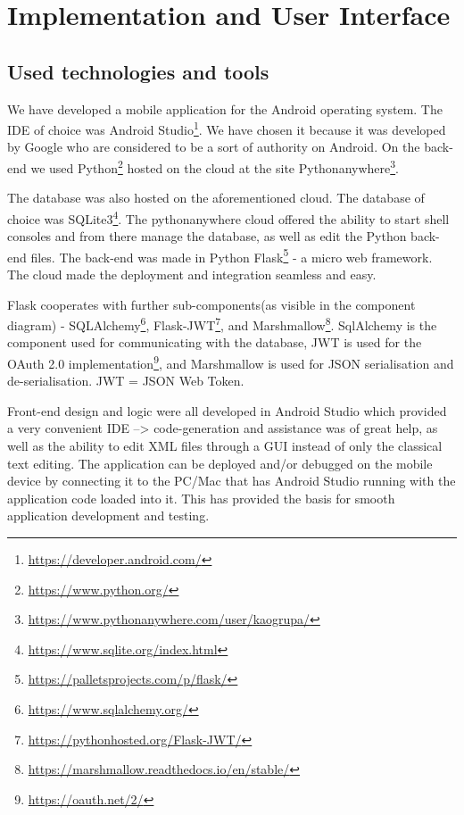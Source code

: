\chapter{Implementation and User Interface}
		
		\section{Used technologies and tools}
		
		We have developed a mobile application for the Android operating system. The IDE of choice was Android Studio\footnote{\url{https://developer.android.com/}}. We have chosen it because it was developed by Google who are considered to be a sort of authority on Android. On the back-end we used Python\footnote{\url{https://www.python.org/}} hosted on the cloud at the site Pythonanywhere\footnote{\url{https://www.pythonanywhere.com/user/kaogrupa/}}.
		
		The database was also hosted on the aforementioned cloud. The database of choice was SQLite3\footnote{\url{https://www.sqlite.org/index.html}}. The pythonanywhere cloud offered the ability to start shell consoles and from there manage the database, as well as edit the Python back-end files. The back-end was made in Python Flask\footnote{\url{https://palletsprojects.com/p/flask/}} - a micro web framework. The cloud made the deployment and integration seamless and easy.
		
		Flask cooperates with further sub-components(as visible in the component diagram) - SQLAlchemy\footnote{\url{https://www.sqlalchemy.org/}}, Flask-JWT\footnote{\url{https://pythonhosted.org/Flask-JWT/}}, and Marshmallow\footnote{\url{https://marshmallow.readthedocs.io/en/stable/}}. SqlAlchemy is the component used for communicating with the database, JWT is used for the OAuth 2.0 implementation\footnote{\url{https://oauth.net/2/}}, and Marshmallow is used for JSON serialisation and de-serialisation. JWT = JSON Web Token.
		
		Front-end design and logic were all developed in Android Studio which provided a very convenient IDE --> code-generation and assistance was of great help, as well as the ability to edit XML files through a GUI instead of only the classical text editing. The application can be deployed and/or debugged on the mobile device by connecting it to the PC/Mac that has Android Studio running with the application code loaded into it. This has provided the basis for smooth application development and testing.
		
